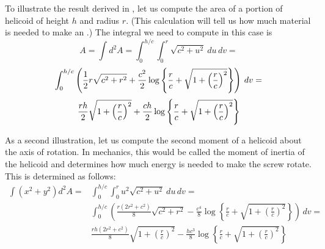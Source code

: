 \documentclass[12pt]{article}
\begin{document}
To illustrate the result derived in , let us compute the area of a portion of helicoid of height $h$ and radius $r$. (This calculation will tell us how much material is needed to make an .)  The integral we need to compute in this case is
 $$A = \int d^2 A = \int_0^{h/c} \int_0^r \sqrt{ c^2 + u^2 } \> du \, dv = $$
 $$\int_0^{h/c} \left( {1 \over 2} r \sqrt{ c^2 + r^2} + {c^2 \over 2} \log \left\{ \frac{r}{c} + \sqrt{ 1 + \left( \frac{r}{c} \right)^2 } \right\} \right) \> dv =$$
 $$\frac{rh}{2} \sqrt{ 1 + \left( \frac{r}{c} \right)^2 } + {ch \over 2} \log \left\{ \frac{r}{c} + \sqrt{ 1 + \left( \frac{r}{c} \right)^2 } \right\}$$

As a second illustration, let us compute the second moment of a helicoid about the axis of rotation.  In mechanics, this would be called the moment of inertia of the helicoid and determines how much energy is needed to make the screw rotate.  This is determined as follows:
 \begin{eqnarray*}
\int (x^2 + y^2) d^2 A = &\int_0^{h/c} \int_0^r u^2 \sqrt{ c^2 + u^2 } \> du \, dv = \\
&\int_0^{h/c} \left( \frac{r (2 r^2 + c^2)}{8} \sqrt{ c^2 + r^2 } - \frac{c^4}{8} \log \left\{ \frac{r}{c} + \sqrt{ 1 + \left( \frac{r}{c} \right)^2 } \right\} \right) \, dv = \\
& \frac{r h (2 r^2 + c^2)}{8} \sqrt{ 1 + \left( \frac{r}{c} \right)^2 } - \frac{h c^3}{8} \log \left\{ \frac{r}{c} + \sqrt{ 1 + \left( \frac{r}{c} \right)^2 } \right\}
 \end{eqnarray*}


\end{document}
